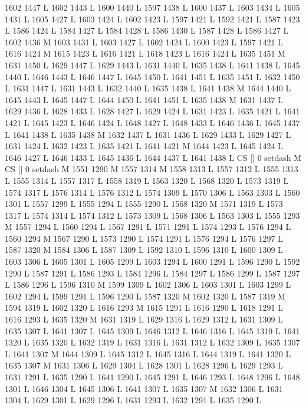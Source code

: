 {{{{{{{{{{{{{{{{{{{{{{{{1602 1447 L
1602 1443 L
1600 1440 L
1597 1438 L
1600 1437 L
1603 1434 L
1605 1431 L
1605 1427 L
1603 1424 L
1602 1423 L
1597 1421 L
1592 1421 L
1587 1423 L
1586 1424 L
1584 1427 L
1584 1428 L
1586 1430 L
1587 1428 L
1586 1427 L
1602 1436 M 1603 1431 L
1603 1427 L
1602 1424 L
1600 1423 L
1597 1421 L
1616 1424 M 1615 1423 L
1616 1421 L
1618 1423 L
1616 1424 L
1635 1451 M 1631 1450 L
1629 1447 L
1629 1443 L
1631 1440 L
1635 1438 L
1641 1438 L
1645 1440 L
1646 1443 L
1646 1447 L
1645 1450 L
1641 1451 L
1635 1451 L
1632 1450 L
1631 1447 L
1631 1443 L
1632 1440 L
1635 1438 L
1641 1438 M 1644 1440 L
1645 1443 L
1645 1447 L
1644 1450 L
1641 1451 L
1635 1438 M 1631 1437 L
1629 1436 L
1628 1433 L
1628 1427 L
1629 1424 L
1631 1423 L
1635 1421 L
1641 1421 L
1645 1423 L
1646 1424 L
1648 1427 L
1648 1433 L
1646 1436 L
1645 1437 L
1641 1438 L
1635 1438 M 1632 1437 L
1631 1436 L
1629 1433 L
1629 1427 L
1631 1424 L
1632 1423 L
1635 1421 L
1641 1421 M 1644 1423 L
1645 1424 L
1646 1427 L
1646 1433 L
1645 1436 L
1644 1437 L
1641 1438 L
CS [] 0 setdash M
CS [] 0 setdash M
1551 1290 M 1557 1314 M 1558 1313 L
1557 1312 L
1555 1313 L
1555 1314 L
1557 1317 L
1558 1319 L
1563 1320 L
1568 1320 L
1573 1319 L
1574 1317 L
1576 1314 L
1576 1312 L
1574 1309 L
1570 1306 L
1563 1303 L
1560 1301 L
1557 1299 L
1555 1294 L
1555 1290 L
1568 1320 M 1571 1319 L
1573 1317 L
1574 1314 L
1574 1312 L
1573 1309 L
1568 1306 L
1563 1303 L
1555 1293 M 1557 1294 L
1560 1294 L
1567 1291 L
1571 1291 L
1574 1293 L
1576 1294 L
1560 1294 M 1567 1290 L
1573 1290 L
1574 1291 L
1576 1294 L
1576 1297 L
1587 1320 M 1584 1306 L
1587 1309 L
1592 1310 L
1596 1310 L
1600 1309 L
1603 1306 L
1605 1301 L
1605 1299 L
1603 1294 L
1600 1291 L
1596 1290 L
1592 1290 L
1587 1291 L
1586 1293 L
1584 1296 L
1584 1297 L
1586 1299 L
1587 1297 L
1586 1296 L
1596 1310 M 1599 1309 L
1602 1306 L
1603 1301 L
1603 1299 L
1602 1294 L
1599 1291 L
1596 1290 L
1587 1320 M 1602 1320 L
1587 1319 M 1594 1319 L
1602 1320 L
1616 1293 M 1615 1291 L
1616 1290 L
1618 1291 L
1616 1293 L
1635 1320 M 1631 1319 L
1629 1316 L
1629 1312 L
1631 1309 L
1635 1307 L
1641 1307 L
1645 1309 L
1646 1312 L
1646 1316 L
1645 1319 L
1641 1320 L
1635 1320 L
1632 1319 L
1631 1316 L
1631 1312 L
1632 1309 L
1635 1307 L
1641 1307 M 1644 1309 L
1645 1312 L
1645 1316 L
1644 1319 L
1641 1320 L
1635 1307 M 1631 1306 L
1629 1304 L
1628 1301 L
1628 1296 L
1629 1293 L
1631 1291 L
1635 1290 L
1641 1290 L
1645 1291 L
1646 1293 L
1648 1296 L
1648 1301 L
1646 1304 L
1645 1306 L
1641 1307 L
1635 1307 M 1632 1306 L
1631 1304 L
1629 1301 L
1629 1296 L
1631 1293 L
1632 1291 L
1635 1290 L
}}}}}}}}}}}}}}}}}}}}}}}}
